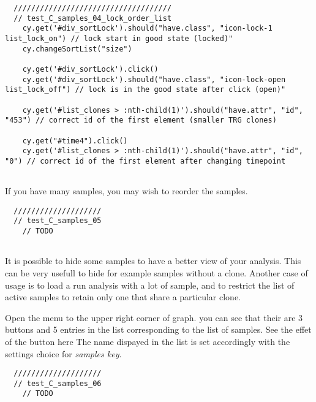 \begin{verbatim}
  ////////////////////////////////////
  // test_C_samples_04_lock_order_list
    cy.get('#div_sortLock').should("have.class", "icon-lock-1 list_lock_on") // lock start in good state (locked)"
    cy.changeSortList("size")

    cy.get('#div_sortLock').click()
    cy.get('#div_sortLock').should("have.class", "icon-lock-open list_lock_off") // lock is in the good state after click (open)"

    cy.get('#list_clones > :nth-child(1)').should("have.attr", "id", "453") // correct id of the first element (smaller TRG clones)

    cy.get("#time4").click()
    cy.get('#list_clones > :nth-child(1)').should("have.attr", "id", "0") // correct id of the first element after changing timepoint


\end{verbatim}

\bigskip

If you have many samples, you may wish to reorder the samples.

\begin{verbatim}
  ////////////////////
  // test_C_samples_05
    // TODO


\end{verbatim}

It is possible to hide some samples to have a better view of your analysis. This can be very usefull to hide for example samples without a clone.
Another case of usage is to load a run analysis with a lot of sample, and to restrict the list of active samples to retain only one that share a particular clone.

Open the menu to the upper right corner of graph. you can see that their are 3 buttons and 5 entries in the list corresponding to the list of samples.
See the effet of the button here
The name dispayed in the list is set accordingly with the settings choice for \textit{samples key}.
\begin{verbatim}
  ////////////////////
  // test_C_samples_06
    // TODO


\end{verbatim}

